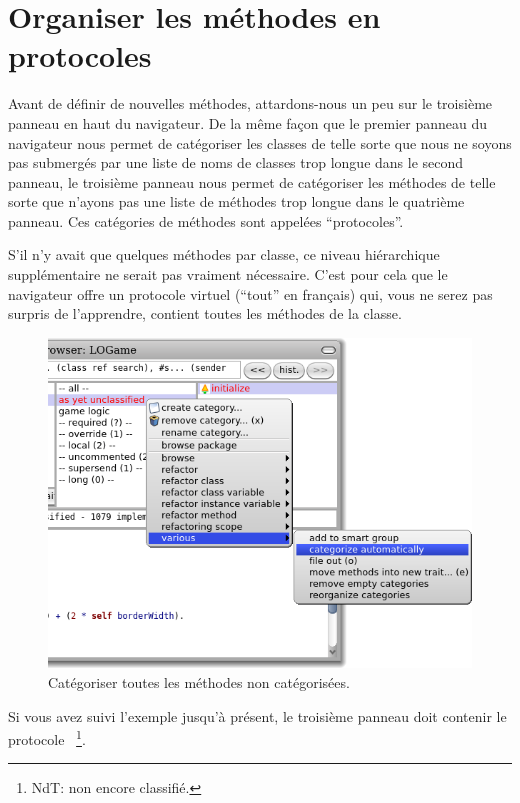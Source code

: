 \documentclass[a4paper,10pt,twoside]{book}
\begin{document}
\section{Organiser les méthodes en protocoles}

Avant de définir de nouvelles méthodes, attardons-nous un peu sur le troisième panneau en haut du navigateur.
De la m\^eme façon que le premier panneau du navigateur nous permet de catégoriser les classes de telle sorte que nous ne soyons pas submergés par une liste de noms de classes trop longue dans le second panneau, le troisième panneau nous permet de catégoriser les méthodes de telle sorte que n'ayons pas une liste de méthodes trop longue dans le quatrième panneau.
Ces catégories de méthodes sont appelées ``protocoles''.

S'il n'y avait que quelques méthodes par classe, ce niveau hiérarchique supplémentaire ne serait pas vraiment nécessaire.
C'est pour cela que le navigateur offre un protocole virtuel
 (\cad ``tout'' en fran\c{c}ais) qui, vous ne serez pas surpris de l'apprendre, contient toutes les méthodes de la classe.

\begin{figure}[htbp]
   \centering
   \includegraphics[scale=0.7]{Categorize} 
   \caption{Catégoriser toutes les méthodes non catégorisées.\label{fig:categorize}}
\end{figure}

Si vous avez suivi l'exemple jusqu'à présent, le troisième panneau doit contenir le protocole ~\footnote{NdT: non encore classifié.}.
\end{document}
